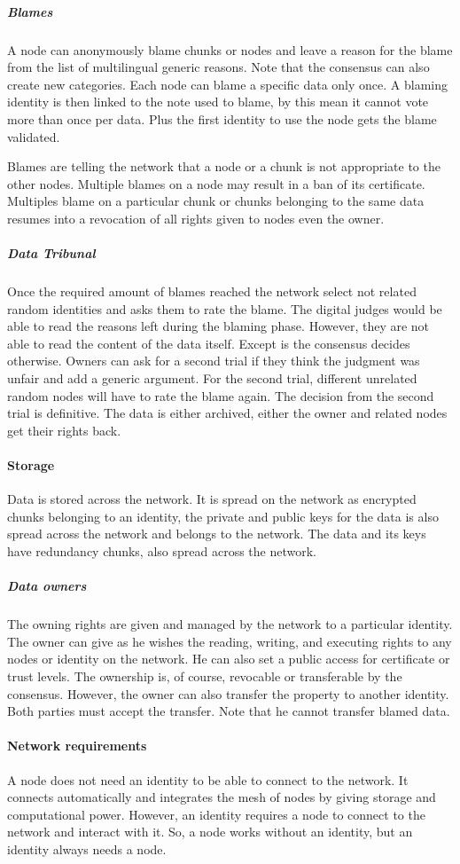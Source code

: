 \subparagraph{Blames} A node can anonymously blame chunks or nodes and leave a reason for the blame from the list of multilingual generic reasons. Note that the consensus can also create new categories. Each node can blame a specific data only once. A blaming identity is then linked to the note used to blame, by this mean it cannot vote more than once per data. Plus the first identity to use the node gets the blame validated.

Blames are telling the network that a node or a chunk is not appropriate to the other nodes. Multiple blames on a node may result in a ban of its certificate. Multiples blame on a particular chunk or chunks belonging to the same data resumes into a revocation of all rights given to nodes even the owner.

\subparagraph{Data Tribunal} Once the required amount of blames reached the network select not related random identities and asks them to rate the blame. The digital judges would be able to read the reasons left during the blaming phase. However, they are not able to read the content of the data itself. Except is the consensus decides otherwise. Owners can ask for a second trial if they think the judgment was unfair and add a generic argument. For the second trial, different unrelated random nodes will have to rate the blame again. The decision from the second trial is definitive. The data is either archived, either the owner and related nodes get their rights back.

\paragraph{Storage} Data is stored across the network. It is spread on the network as encrypted chunks belonging to an identity, the private and public keys for the data is also spread across the network and belongs to the network. The data and its keys have redundancy chunks, also spread across the network.

\subparagraph{Data owners} The owning rights are given and managed by the network to a particular identity. The owner can give as he wishes the reading, writing, and executing rights to any nodes or identity on the network. He can also set a public access for certificate or trust levels. The ownership is, of course, revocable or transferable by the consensus. However, the owner can also transfer the property to another identity. Both parties must accept the transfer. Note that he cannot transfer blamed data.

\paragraph{Network requirements} A node does not need an identity to be able to connect to the network. It connects automatically and integrates the mesh of nodes by giving storage and computational power. However, an identity requires a node to connect to the network and interact with it. So, a node works without an identity, but an identity always needs a node.

